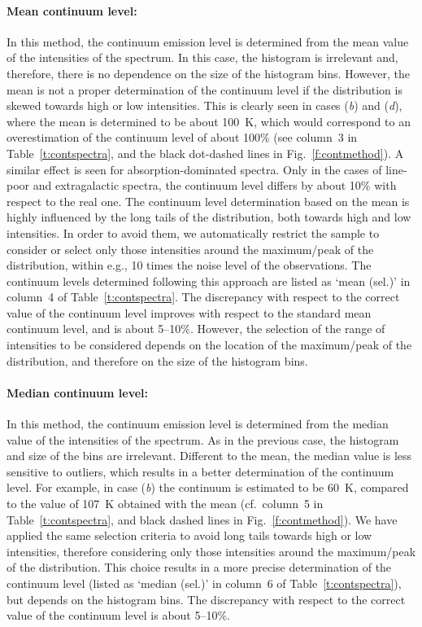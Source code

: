 \documentclass{aa}
\begin{document}
\paragraph{\textbf{Mean continuum level}:}
In this method, the continuum emission level is determined from the mean value of the intensities of the spectrum. In this case, the histogram is irrelevant and, therefore, there is no dependence on the size of the histogram bins. However, the mean is not a proper determination of the continuum level if the distribution is skewed towards high or low intensities. This is clearly seen in cases (\textit{b}) and (\textit{d}), where the mean is determined to be about 100~K, which would correspond to an overestimation of the continuum level of about 100\% (see column~3 in Table~\ref{t:contspectra}, and the black dot-dashed lines in Fig.~\ref{f:contmethod}). A similar effect is seen for absorption-dominated spectra. Only in the cases of line-poor and extragalactic spectra, the continuum level differs by about 10\% with respect to the real one. The continuum level determination based on the mean is highly influenced by the long tails of the distribution, both towards high and low intensities. In order to avoid them, we automatically restrict the sample to consider or select only those intensities around the maximum/peak of the distribution, within e.g., 10 times the noise level of the observations. The continuum levels determined following this approach are listed as `mean (sel.)' in column~4 of Table~\ref{t:contspectra}. The discrepancy with respect to the correct value of the continuum level improves with respect to the standard mean continuum level, and is about 5--10\%. However, the selection of the range of intensities to be considered depends on the location of the maximum/peak of the distribution, and therefore on the size of the histogram bins.

\paragraph{\textbf{Median continuum level}:}
In this method, the continuum emission level is determined from the median value of the intensities of the spectrum. As in the previous case, the histogram and size of the bins are irrelevant. Different to the mean, the median value is less sensitive to outliers, which results in a better determination of the continuum level. For example, in case (\textit{b}) the continuum is estimated to be 60~K, compared to the value of 107~K obtained with the mean (cf.\ column~5 in Table~\ref{t:contspectra}, and black dashed lines in Fig.~\ref{f:contmethod}). We have applied the same selection criteria to avoid long tails towards high or low intensities, therefore considering only those intensities around the maximum/peak of the distribution. This choice results in a more precise determination of the continuum level (listed as `median (sel.)' in column~6 of Table~\ref{t:contspectra}), but depends on the histogram bins. The discrepancy with respect to the correct value of the continuum level is about 5--10\%.
\end{document}

